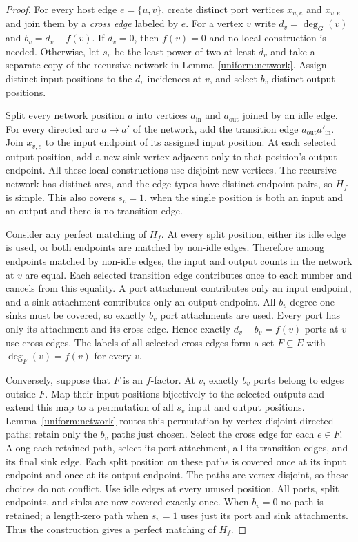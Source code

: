 \begin{proof}
For every host edge $e=\{u,v\}$, create distinct port vertices
$x_{u,e}$ and $x_{v,e}$ and join them by a \emph{cross edge} labeled by $e$.
For a vertex $v$ write $d_v=\deg_G(v)$ and $b_v=d_v-f(v)$. If $d_v=0$,
then $f(v)=0$ and no local construction is needed. Otherwise, let $s_v$ be
the least power of two at least $d_v$ and take a separate copy of the
recursive network in Lemma~\ref{uniform:network}. Assign distinct input
positions to the $d_v$ incidences at $v$, and select $b_v$ distinct output
positions.

Split every network position $a$ into vertices $a_{\mathrm{in}}$ and
$a_{\mathrm{out}}$ joined by an idle edge. For every directed arc $a\to a'$
of the network, add the transition edge
$a_{\mathrm{out}}a'_{\mathrm{in}}$. Join $x_{v,e}$ to the input endpoint
of its assigned input position. At each selected output position, add a new
sink vertex adjacent only to that position's output endpoint. All these
local constructions use disjoint new vertices. The recursive network has
distinct arcs, and the edge types have distinct endpoint pairs, so $H_f$ is
simple. This also covers $s_v=1$, when the single position is both an input
and an output and there is no transition edge.

Consider any perfect matching of $H_f$. At every split position, either its
idle edge is used, or both endpoints are matched by non-idle edges. Therefore
among endpoints matched by non-idle edges, the input and output counts in
the network at $v$ are equal. Each selected transition edge contributes once
to each number and
cancels from this equality. A port attachment contributes only an input
endpoint, and a sink attachment contributes only an output endpoint. All
$b_v$ degree-one sinks must be covered, so exactly $b_v$ port attachments
are used. Every port has only its attachment and its cross edge. Hence
exactly $d_v-b_v=f(v)$ ports at $v$ use cross edges. The labels of all
selected cross edges form a set $F\subseteq E$ with $\deg_F(v)=f(v)$ for
every $v$.

Conversely, suppose that $F$ is an $f$-factor. At $v$, exactly $b_v$ ports
belong to edges outside $F$. Map their input positions bijectively to the
selected outputs and extend this map to a permutation of all $s_v$ input
and output positions. Lemma~\ref{uniform:network} routes this permutation
by vertex-disjoint directed paths; retain only the $b_v$ paths just chosen.
Select the cross edge for each $e\in F$. Along each retained path, select
its port attachment, all its transition edges, and its final sink edge.
Each split position on these paths is covered once at its input endpoint
and once at its output endpoint. The paths are vertex-disjoint, so these
choices do not conflict. Use idle edges at every unused position. All ports,
split endpoints, and sinks are now covered exactly once. When $b_v=0$ no
path is retained; a length-zero path when $s_v=1$ uses just its port and
sink attachments. Thus the construction gives a perfect matching of $H_f$.


\end{proof}
